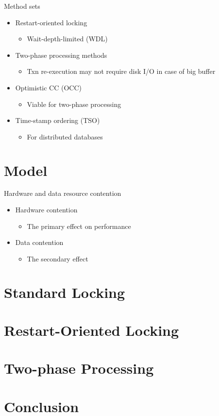 \documentclass[sans]{beamer}
\begin{document}
\begin{frame}{Method sets}
  \begin{itemize}
    \item Restart-oriented locking
    \begin{itemize}
      \item Wait-depth-limited (WDL)
    \end{itemize}

    \item Two-phase processing methods
    \begin{itemize}
      \item Txn re-execution may not require disk I/O
            in case of big buffer
    \end{itemize}
    \item Optimistic CC (OCC)
    \begin{itemize}
      \item Viable for two-phase processing
    \end{itemize}
    \item Time-stamp ordering (TSO)
    \begin{itemize}
      \item For distributed databases
    \end{itemize}
  \end{itemize}
\end{frame}

\section{Model}

\begin{frame}{Hardware and data resource contention}
  \begin{itemize}
    \item Hardware contention
    \begin{itemize}
      \item The primary effect on performance
    \end{itemize}
    \item Data contention
    \begin{itemize}
      \item The secondary effect
    \end{itemize}
  \end{itemize}
\end{frame}

\section{Standard Locking}

\section{Restart-Oriented Locking}

\section{Two-phase Processing}

\section{Conclusion}
\end{document}
